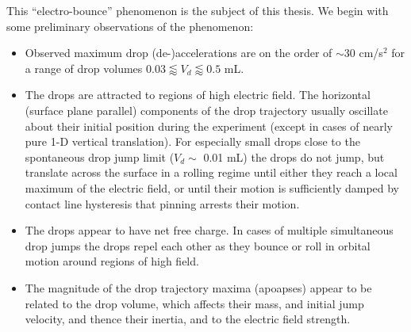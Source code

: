 \documentclass[12pt,a4paper,oneside]{book}
\begin{document}
This ``electro-bounce'' phenomenon is the subject of this thesis. We begin with some preliminary observations of the phenomenon:
\begin{itemize}
\item Observed maximum drop (de-)accelerations are on the order of $\sim$30 cm/s$^2$ for a range of drop volumes $0.03 \lessapprox V_d \lessapprox 0.5$ mL.
\item The drops are attracted to regions of high electric field. The horizontal (surface plane parallel) components of the drop trajectory usually oscillate about their initial position during the experiment (except in cases of nearly pure 1-D vertical translation). For especially small drops close to the spontaneous drop jump limit ($V_d \sim$ 0.01 mL) the drops do not jump, but translate across the surface in a rolling regime until either they reach a local maximum of the electric field, or until their motion is sufficiently damped by contact line hysteresis that pinning arrests their motion.
\item The drops appear to have net free charge. In cases of multiple simultaneous drop jumps the drops repel each other as they bounce or roll in orbital motion around regions of high field.
\item The magnitude of the drop trajectory maxima (apoapses) appear to be related to the drop volume, which affects their mass, and initial jump velocity, and thence their inertia, and to the electric field strength.
\end{itemize}
\end{document}
